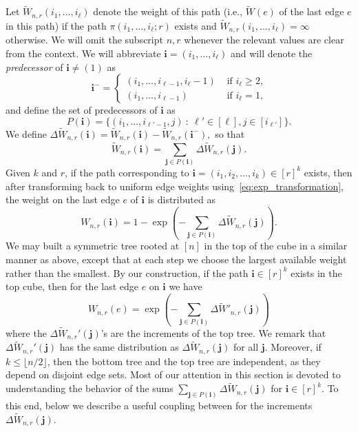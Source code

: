 \documentclass[11pt]{article}
\theoremstyle{definition}
\theoremstyle{remark}
\theoremstyle{remark}
\numberwithin{theorem}{section}
\begin{document}
Let $\widetilde{W}_{n,r}(i_1,\dots, i_\ell)$ denote the weight of this path (i.e., $\widetilde{W}(e)$ of the last edge $e$ in this path) if the path $\pi(i_1,\dots,i_\ell;r)$ exists and $\widetilde{W}_{n,r}(i_1,\dots, i_\ell)=\infty$ otherwise. We will omit the subscript $n,r$ whenever the relevant values are clear from the context. We will abbreviate $\bm{i}=(i_1,\dots,i_\ell)$ and will denote the \emph{predecessor} of $\bm i\neq(1)$ as
\[
\bm i^-=\begin{cases}
    (i_1,\dots,i_{\ell-1},i_\ell-1)&\text{ if $i_\ell\ge2$,}\\
    (i_1,\dots,i_{\ell-1})&\text{ if $i_\ell=1$,}
\end{cases}
\]
and define the set of predecessors of $\bm i$ as
$$
P(\bm{i})=\{(i_1,\dots,i_{\ell'-1},j)\ :\ \ell'\in[\ell],j\in[i_{\ell'}]\}.
$$
We define
\(
\Delta \widetilde{W}_{n,r}(\bm i)=\widetilde{W}_{n,r}(\bm i)-\widetilde{W}_{n,r}(\bm i^-),
\)
so that
\begin{equation}\label{eq:W(i)_sum}
\widetilde{W}_{n,r}(\bm{i})=\sum_{\bm{j}\in P(\bm{i})}\Delta \widetilde{W}_{n,r}(\bm{j}).
\end{equation}
Given $k$ and $r$, if the path corresponding to $\bm{i} = (i_{1},i_{2},\dots,i_{k}) \in [r]^{k}$ exists, then after transforming back to uniform edge weights using~\eqref{eq:exp_transformation}, the weight on the last edge $e$ of $\bm{i}$ is distributed as
\[
    W_{n,r}(\bm{i}) = 1 - \exp\left(-\sum_{\bm{j} \in P(\bm{i})}\Delta\widetilde{W}_{n,r}(\bm{j}) \right).
\]
We may built a symmetric tree rooted at $[n]$ in the top of the cube in a similar manner as above, except that at each step we choose the largest available weight rather than the smallest. By our construction, if the path $\bm{i} \in [r]^{k}$ exists in the top cube, then for the last edge $e$ on $\bm{i}$ we have
\[
	W_{n,r}(e) = \exp\left(-\sum_{\bm{j}\in P(\bm{i})} \Delta \widetilde{W}'_{n,r}(\bm{j}) \right)
\]
where the $\Delta\widetilde{W}_{n,r}'(\bm{j})$'s are the increments of the top tree. We remark that $\Delta\widetilde{W}_{n,r}'(\bm{j})$ has the same distribution as $\Delta\widetilde{W}_{n,r}(\bm{j})$ for all $\bm{j}$. Moreover, if $k \leq \lfloor n/2 \rfloor$, then the bottom tree and the top tree are independent, as they depend on disjoint edge sets. Most of our attention in this section is devoted to understanding the behavior of the sums $\sum_{\bm{j} \in P(\bm{i})}\Delta\widetilde{W}_{n,r}(\bm{j})$ for $\bm{i} \in [r]^{k}$. To this end, below we describe a useful coupling between for the increments $\Delta\widetilde{W}_{n,r}(\bm{j})$.
\end{document}

